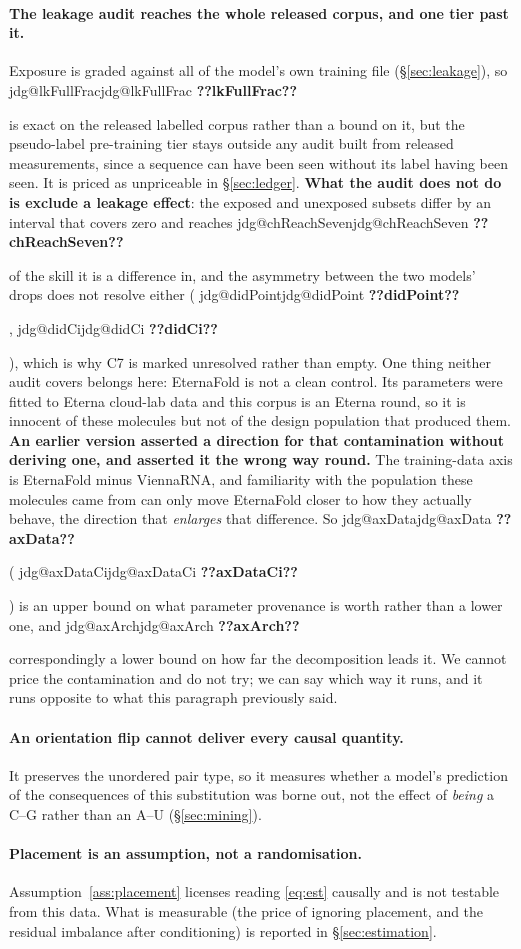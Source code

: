 \documentclass[11pt]{article}
\makeatletter
\newcommand{\jdg}[1]{%
  \ifcsname jdg@#1\endcsname\csname jdg@#1\endcsname
  \else\textbf{??#1??}\PackageError{nm}{undefined measured quantity #1}{}\fi}
\makeatother
\begin{document}
\paragraph{The leakage audit reaches the whole released corpus, and one tier past it.} Exposure is
graded against all of the model's own training file (\S\ref{sec:leakage}), so \jdg{lkFullFrac} is
exact on the released labelled corpus rather than a bound on it, but the pseudo-label
pre-training tier stays outside any audit built from released measurements, since a sequence can
have been seen without its label having been seen. It is priced as unpriceable in
\S\ref{sec:ledger}. \textbf{What the audit does not do is exclude a leakage effect}: the exposed
and unexposed subsets differ by an interval that covers zero and reaches \jdg{chReachSeven} of the
skill it is a difference in, and the asymmetry between the two models' drops does not resolve
either (\jdg{didPoint}, \jdg{didCi}), which is why C7 is marked unresolved rather than empty. One
thing neither audit covers belongs here: EternaFold is not a clean control. Its parameters were fitted to Eterna cloud-lab data and this corpus is an Eterna round,
so it is innocent of these molecules but not of the design population that produced them.
\textbf{An earlier version asserted a direction for that contamination without deriving one, and
asserted it the wrong way round.} The training-data axis is EternaFold minus ViennaRNA, and
familiarity with the population these molecules came from can only move EternaFold closer to how
they actually behave, the direction that \emph{enlarges} that difference. So \jdg{axData}
(\jdg{axDataCi}) is an upper bound on what parameter provenance is worth rather than a lower one,
and \jdg{axArch} correspondingly a lower bound on how far the decomposition leads it. We cannot
price the contamination and do not try; we can say which way it runs, and it runs opposite to what
this paragraph previously said.

\paragraph{An orientation flip cannot deliver every causal quantity.} It preserves the unordered
pair type, so it measures whether a model's prediction of the consequences of this substitution
was borne out, not the effect of \emph{being} a C--G rather than an A--U (\S\ref{sec:mining}).

\paragraph{Placement is an assumption, not a randomisation.} Assumption~\ref{ass:placement}
licenses reading \eqref{eq:est} causally and is not testable from this data. What is measurable (the price of ignoring placement, and the residual imbalance after conditioning) is reported in
\S\ref{sec:estimation}.
\end{document}
